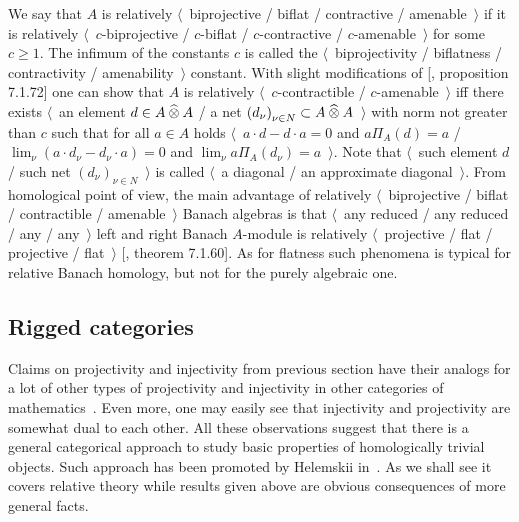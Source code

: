 We say that $A$ is relatively $\langle$~biprojective / biflat / contractive /
amenable~$\rangle$ if it is relatively $\langle$~$c$-biprojective / $c$-biflat /
$c$-contractive / $c$-amenable~$\rangle$ for some $c\geq 1$. The infimum of the
constants $c$ is called the $\langle$~biprojectivity / biflatness /
contractivity / amenability~$\rangle$ constant.  With slight modifications of
[\cite{HelBanLocConvAlg}, proposition 7.1.72] one can show that $A$ is
relatively $\langle$~$c$-contractible / $c$-amenable~$\rangle$ iff there exists
$\langle$~an element $d\in A\mathbin{\widehat{\otimes}} A$ / a net 
${(d_\nu)}_{\nu\in N}\subset A\mathbin{\widehat{\otimes}} A$~$\rangle$ with 
norm not greater than $c$ such that for all $a\in A$ holds 
$\langle$~$a\cdot d-d\cdot a=0$ and $a\Pi_A(d)=a$ / 
$\lim_\nu(a\cdot d_\nu-d_\nu\cdot a)=0$ 
and $\lim_\nu a\Pi_A(d_\nu)=a$~$\rangle$. Note that 
$\langle$~such element $d$ / such net ${(d_\nu)}_{\nu\in N}$~$\rangle$ is called
$\langle$~a diagonal / an approximate diagonal~$\rangle$. From homological point
of view, the main advantage of relatively $\langle$~biprojective / biflat /
contractible / amenable~$\rangle$ Banach algebras is that $\langle$~any reduced
/ any reduced / any / any~$\rangle$ left and right Banach $A$-module is
relatively $\langle$~projective / flat / projective / flat~$\rangle$
[\cite{HelBanLocConvAlg}, theorem 7.1.60]. As for flatness such phenomena is
typical for relative Banach homology, but not for the purely algebraic one.


\subsection{Rigged categories}\label{SubSectionRiggedCategories}

Claims on projectivity and injectivity from previous section have their analogs
for a lot of other types of projectivity and injectivity in other categories of
mathematics~\cite{SemadeniProjInjDual}. Even more, one may easily see that
injectivity and projectivity are somewhat dual to each other. All these
observations suggest that there is a general categorical approach to study basic
properties of homologically trivial objects. Such approach has been promoted by
Helemskii in~\cite{HelMetrFrQMod}. As we shall see it covers relative theory
while results given above are obvious consequences of more general facts. 

